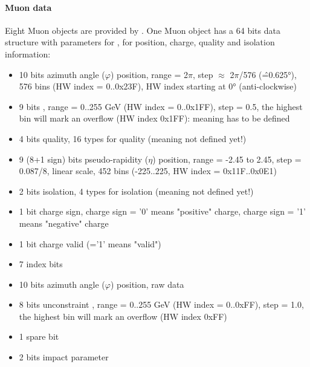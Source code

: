 \paragraph{Muon data}
\label{sec:gtl:muon_data}
Eight Muon objects are provided by \gmt. One Muon object has a 64 bits data structure with parameters for \pt, for position, charge, quality and isolation information: 
\begin{itemize}
\item 10 bits azimuth angle ($\varphi$) position, range = 2$\pi$, step $\approx$ 2$\pi$/576 (\^=0.625°), 576 bins (HW index = 0..0x23F), HW index starting at 0° (anti-clockwise)
\item 9 bits \pt, range = 0..255 GeV (HW index = 0..0x1FF), step = 0.5, the highest bin will mark an overflow (HW index 0x1FF): meaning has to be defined
\item 4 bits quality, 16 types for quality (meaning not defined yet!)
\item 9 (8+1 sign) bits pseudo-rapidity ($\eta$) position, range = -2.45 to 2.45, step = 0.087/8, linear scale, 452 bins (-225..225, HW index = 0x11F..0x0E1)
\item 2 bits isolation, 4 types for isolation (meaning not defined yet!)
\item 1 bit charge sign, charge sign = '0' means "positive" charge, charge sign = '1' means "negative" charge
\item 1 bit charge valid (='1' means "valid")
\item 7 index bits
\item 10 bits azimuth angle ($\varphi$) position, raw data
\item 8 bits unconstraint \pt, range = 0..255 GeV (HW index = 0..0xFF), step = 1.0, the highest bin will mark an overflow (HW index 0xFF)
\item 1 spare bit
\item 2 bits impact parameter
\end{itemize}

